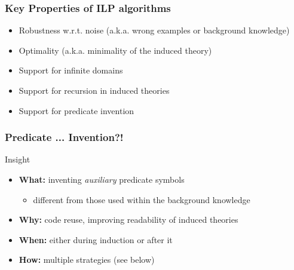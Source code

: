 \documentclass[presentation]{beamer}\mode<presentation>{\usetheme{AMSBolognaFC}}
\begin{document}
\begin{frame}%
\frametitle{Key Properties of ILP algorithms}

    \begin{itemize}
        \item \alert{Robustness} w.r.t. noise (a.k.a. wrong examples or background knowledge)
        \bigskip
        \item \alert{Optimality} (a.k.a. minimality of the induced theory)
        \bigskip
        \item Support for \alert{infinite domains}
        \bigskip
        \item Support for \alert{recursion} in induced theories
        \bigskip
        \item Support for \alert{predicate invention}
    \end{itemize}
\end{frame}

\begin{frame}%
\frametitle{Predicate ... Invention?!}
\label{slide:pi}

    \begin{block}{Insight}
        \begin{itemize}
            \item \textbf{What:} \alert{inventing} \emph{auxiliary} predicate symbols
            \begin{itemize}
                \item different from those used within the background knowledge
            \end{itemize}
            \item \textbf{Why:} \alert{code reuse}, improving readability of induced theories
            \item \textbf{When:} either \alert{during} induction or \alert{after} it
            \item \textbf{How:} multiple strategies (see below)
        \end{itemize}
    \end{block}

\end{frame}
\end{document}
